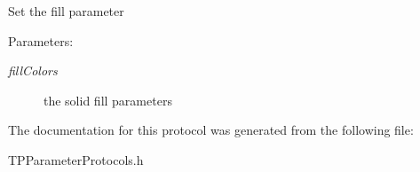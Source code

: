 Set the fill parameter \begin{Desc}
\item[Parameters:]
\begin{description}
\item[{\em fillColors}]the solid fill parameters \end{description}
\end{Desc}


The documentation for this protocol was generated from the following file:\begin{CompactItemize}
\item 
TPParameterProtocols.h\end{CompactItemize}
